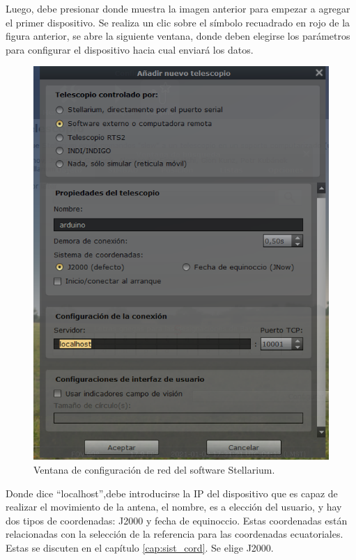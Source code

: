 Luego, debe presionar donde muestra la imagen anterior para empezar a agregar el primer dispositivo. Se realiza un clic sobre el símbolo recuadrado en rojo de la figura anterior, se abre la siguiente ventana, donde deben elegirse los parámetros para configurar el dispositivo hacia cual enviará los datos.
\begin{figure}[ht!]
	\centering
	\includegraphics[scale=0.5]{stellarium-024}
	\caption{Ventana de configuración de red del software Stellarium.}
\end{figure} 

Donde dice ``localhost'',debe introducirse la IP del dispositivo que es capaz de realizar el movimiento de la antena, el nombre, es a elección del usuario, y hay dos tipos de coordenadas: J2000 y fecha de equinoccio. Estas coordenadas están relacionadas con la selección de la referencia para las coordenadas ecuatoriales. Estas se discuten en el capítulo \ref{cap:sist_cord}. Se elige J2000.

